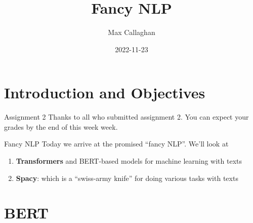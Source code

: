 \documentclass[
  10pt,
  ignorenonframetext,
  aspectratio=169]{beamer}
\title{Fancy NLP}
\author{Max Callaghan}
\date{2022-11-23}
\begin{document}
\frame{\titlepage}

\hypertarget{introduction-and-objectives}{%
\section{Introduction and
Objectives}\label{introduction-and-objectives}}

\begin{frame}{Assignment 2}
\protect\hypertarget{assignment-2}{}
Thanks to all who submitted assignment 2. You can expect your grades by
the end of this week week.
\end{frame}

\begin{frame}{Fancy NLP}
\protect\hypertarget{fancy-nlp}{}
Today we arrive at the promised ``fancy NLP''. We'll look at

\begin{enumerate}
  \item<1->\textbf{Transformers} and BERT-based models for machine learning with texts
  \item<2->\textbf{Spacy}: which is a ``swiss-army knife'' for doing various tasks with texts
\end{enumerate}


\end{frame}

\hypertarget{bert}{%
\section{BERT}\label{bert}}
\end{document}
